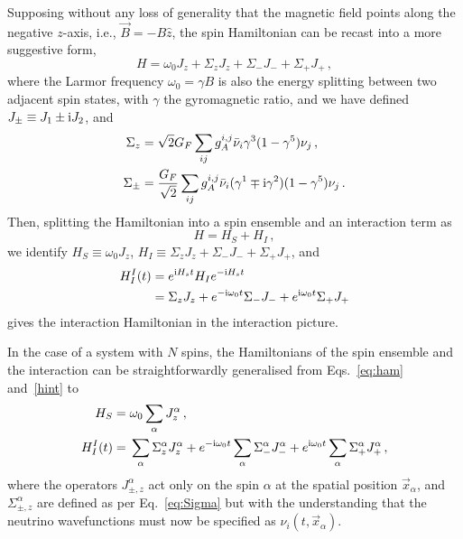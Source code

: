 \documentclass[aps,prd,10pt,twocolumn,superscriptaddress,floatfix,nofootinbib,amsmath,amssymb,altaffilletter,preprintnumbers]{revtex4-1}
\begin{document}
  

 Supposing without any loss of generality that the magnetic field points along the negative $z$-axis, i.e., $\vec{B}=-B \hat{z}$,
 the spin Hamiltonian can be recast into a more suggestive form,
\begin{equation}
     H =\omega_0J_z+  \Sigma_zJ_z+\Sigma_-J_-+\Sigma_+J_+\, ,
\end{equation}
where the Larmor frequency $\omega_0=\gamma B$ is also the energy splitting between two adjacent spin states, with $\gamma$ the gyromagnetic ratio, and we have defined $J_\pm \equiv J_1\pm {\rm i}J_2$, and 
\begin{equation}
\begin{aligned}
  \Sigma_z =&\; \sqrt{2}G_F  \sum_{ij} g^{i,j}_A\bar{\nu}_i\gamma^3(1-\gamma^5)\nu_j \, , \\ \Sigma_\pm  =&\;  \frac{G_F}{\sqrt{2}} \sum_{ij} g^{i,j}_A\bar{\nu}_i(\gamma^1\mp {\rm i}\gamma^2)(1-\gamma^5)\nu_j \, .
  \label{eq:Sigma}
  \end{aligned}
\end{equation}
Then, splitting the  Hamiltonian into a spin ensemble and an interaction term as 
\begin{equation}
    H=H_S+H_I\,,
    \label{eq:ham}
\end{equation}
we identify $H_S \equiv \omega_0J_z$, $H_I \equiv \Sigma_zJ_z+\Sigma_-J_-+\Sigma_+J_+$, and 
\begin{equation}
\begin{aligned}
   H^I_I(t)= &\; e^{{\rm i}H_st} H_I e^{-{\rm i}H_st} \\
   =&\; \Sigma_zJ_z+
   e^{-{\rm i}\omega_0 t}\Sigma_-J_-+e^{{\rm i}\omega_0t}\Sigma_+J_+  
   \label{hint}
   \end{aligned}
\end{equation}
gives the interaction Hamiltonian in the interaction picture.

In the case of a system with $N$ spins, the Hamiltonians of the spin ensemble and the interaction can be straightforwardly generalised from Eqs.~\eqref{eq:ham} and~\eqref{hint} to 
\begin{equation}
\begin{aligned}
    H_S= &\; \omega_0\sum_\alpha J^\alpha_z\, , \\
   H^I_I(t)= &\; \sum_\alpha\Sigma^\alpha_zJ^\alpha_z+e^{-{\rm i}\omega_0t}\sum_\alpha\Sigma^\alpha_-J^\alpha_-+e^{{\rm i}\omega_0t}\sum_\alpha\Sigma^\alpha_+J^\alpha_+\, ,  
   \label{eq:nham}
   \end{aligned}
\end{equation}
where the operators $J^\alpha_{\pm,z}$ act only on the spin $\alpha$ at the spatial position $\vec{x}_\alpha$, and $\Sigma^\alpha_{\pm,z}$ are defined as per Eq.~\eqref{eq:Sigma} but with the understanding that the neutrino wavefunctions must now be specified as $\nu_i(t,\vec{x}_\alpha)$.
\end{document}
